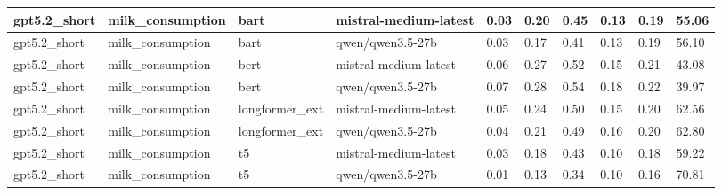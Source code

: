 \begin{tabular}{|l|l|l|l|l|l|l|l|l|l|}
 \hline
 gpt5.2\_short & milk\_consumption & bart & mistral-medium-latest & 0.03 & 0.20 & 0.45 & 0.13 & 0.19 & 55.06 \\
 \hline
 gpt5.2\_short & milk\_consumption & bart & qwen/qwen3.5-27b & 0.03 & 0.17 & 0.41 & 0.13 & 0.19 & 56.10 \\
 \hline
 gpt5.2\_short & milk\_consumption & bert & mistral-medium-latest & 0.06 & 0.27 & 0.52 & 0.15 & 0.21 & 43.08 \\
 \hline
 gpt5.2\_short & milk\_consumption & bert & qwen/qwen3.5-27b & 0.07 & 0.28 & 0.54 & 0.18 & 0.22 & 39.97 \\
 \hline
 gpt5.2\_short & milk\_consumption & longformer\_ext & mistral-medium-latest & 0.05 & 0.24 & 0.50 & 0.15 & 0.20 & 62.56 \\
 \hline
 gpt5.2\_short & milk\_consumption & longformer\_ext & qwen/qwen3.5-27b & 0.04 & 0.21 & 0.49 & 0.16 & 0.20 & 62.80 \\
 \hline
 gpt5.2\_short & milk\_consumption & t5 & mistral-medium-latest & 0.03 & 0.18 & 0.43 & 0.10 & 0.18 & 59.22 \\
 \hline
 gpt5.2\_short & milk\_consumption & t5 & qwen/qwen3.5-27b & 0.01 & 0.13 & 0.34 & 0.10 & 0.16 & 70.81 \\
\hline
\end{tabular}
